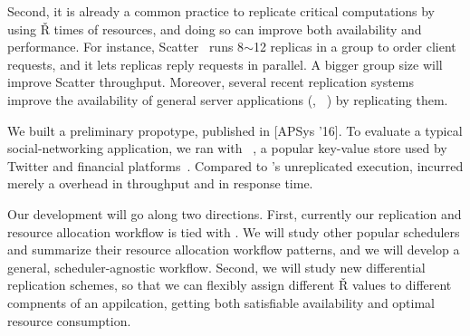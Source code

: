 Second, it is already a common practice to replicate critical computations by 
using \v{R} times of resources, and doing so can improve both availability and 
performance. For instance, Scatter~\cite{scatter:sosp11} runs 8$\sim$12 
replicas in a \paxos group to order client requests, and it lets replicas reply 
requests in parallel. A bigger group size will improve Scatter throughput. 
Moreover, several recent replication 
systems~\cite{eve:osdi12,rex:eurosys14,crane:sosp15} 
improve the availability of general server applications (\eg, 
\mysql~\cite{mysql}) by replicating them.




 We built a preliminary \tripod propotype, 
published in [APSys '16]. To evaluate a typical social-networking application, 
we ran \tripod with \memcached~\cite{memcached}, a popular key-value store used 
by Twitter and financial platforms~\cite{nosql:finance}. Compared to 
\memcached's unreplicated execution, \tripod incurred merely a \tputoverhead 
overhead in throughput and \latencyoverhead in response time.


 Our \tripod development will go along two directions. 
First, currently our replication and resource allocation workflow is tied with 
\mesos. We will study other popular schedulers and summarize their 
resource allocation workflow patterns, and we will develop a general, 
scheduler-agnostic workflow. Second, we will study new differential replication 
schemes, so that we can flexibly assign different \v{R} values to different 
compnents of an appilcation, getting both satisfiable availability and optimal 
resource consumption.

